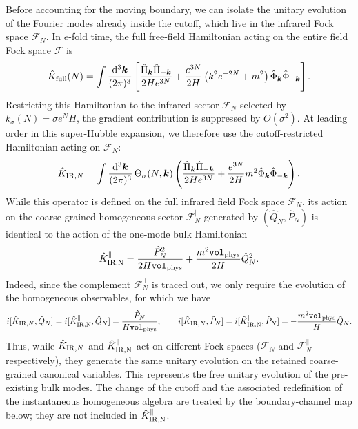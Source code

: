 \documentclass{article}
\newcommand{\Vphys}{\mathtt{vol}_{\rm phys}}
\newcommand{\hvarphi}{\hat{\Phi}}
\newcommand{\hpi}{\hat{\Pi}}
\numberwithin{equation}{section}
\begin{document}
	Before accounting for the moving boundary, we can isolate the unitary evolution of the Fourier modes already inside the cutoff, which live in the infrared Fock space $\mathcal{F}_N$. In $e$-fold time, the full free-field Hamiltonian acting on the entire field Fock space $\mathcal{F}$ is
	\begin{equation}\label{eq:KFullModesMain}
		\hat K_{\rm full}(N)
		= \int \frac{\dd^3\bm{k}}{(2\pi)^3}
		\left[
		\frac{\hpi_{\bm{k}}\hpi_{-\bm{k}}}{2H e^{3N}}
		+\frac{e^{3N}}{2H}\left(k^2e^{-2N}+m^2\right)
		\hvarphi_{\bm{k}}\hvarphi_{-\bm{k}}
		\right] .
	\end{equation}
	Restricting this Hamiltonian to the infrared sector $\mathcal{F}_N$ selected by $k_\sigma(N)=\sigma e^NH$, the gradient contribution is suppressed by $O(\sigma^2)$. At leading order in this super-Hubble expansion, we therefore use the cutoff-restricted Hamiltonian acting on $\mathcal{F}_N$:
	\begin{equation}\label{eq:KIRModesMain}
		\hat K_{{\rm IR},N}
		= \int \frac{\dd^3\bm{k}}{(2\pi)^3}\,\Theta_\sigma(N,\bm{k})
		\left(
		\frac{\hpi_{\bm{k}}\hpi_{-\bm{k}}}{2H e^{3N}}
		+\frac{e^{3N}}{2H}m^2
		\hvarphi_{\bm{k}}\hvarphi_{-\bm{k}}
		\right) .
	\end{equation}
	While this operator is defined on the full infrared field Fock space $\mathcal{F}_N$, its action on the coarse-grained homogeneous sector $\mathcal{F}_N^\parallel$ generated by $(\hat Q_N,\hat P_N)$ is identical to the action of the one-mode bulk Hamiltonian
	\begin{equation}\label{eq:KbulkMain}
		\hat K_{\rm IR, N}^{\parallel}
		= \frac{\hat P_N^2}{2H\Vphys}
		+ \frac{m^2\Vphys}{2H}\hat Q_N^2 .
	\end{equation}
	Indeed, since the complement $\mathcal{F}_N^\perp$ is traced out, we only require the evolution of the homogeneous observables, for which we have
	\begin{equation}
		i[\hat K_{{\rm IR},N},\hat Q_N]
		=i[\hat K_{\rm IR, N}^{\parallel},\hat Q_N]
		= \frac{\hat P_N}{H\Vphys},
		\qquad
		i[\hat K_{{\rm IR},N},\hat P_N]
		=i[\hat K_{\rm IR, N}^{\parallel},\hat P_N]
		= -\frac{m^2\Vphys}{H}\hat Q_N .
	\end{equation}
	Thus, while $\hat K_{{\rm IR},N}$ and $\hat K_{\rm IR, N}^{\parallel}$ act on different Fock spaces ($\mathcal{F}_N$ and $\mathcal{F}_N^\parallel$ respectively), they generate the same unitary evolution on the retained coarse-grained canonical variables. This represents the free unitary evolution of the pre-existing bulk modes. The change of the cutoff and the associated redefinition of the instantaneous homogeneous algebra are treated by the boundary-channel map below; they are not included in $\hat K_{\rm IR, N}^{\parallel}$.
\end{document}
